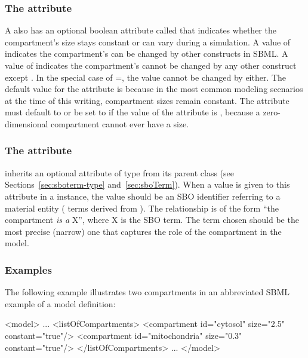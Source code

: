 \subsubsection{The  attribute}
\label{sec:compartment-constant}

A \Compartment also has an optional boolean attribute called
 that indicates whether the compartment's size
stays constant or can vary during a simulation.  A value of
 indicates the compartment's  can be
changed by other constructs in SBML.  A value of 
indicates the compartment's  cannot be changed by any
other construct except \InitialAssignment.  In the special case of
=, the value cannot be changed by
\InitialAssignment either.  The default value for the
 attribute is  because in the most common
modeling scenarios at the time of this writing, compartment sizes
remain constant.  The  attribute must default to or be
set to  if the value of the 
attribute is , because a zero-dimensional compartment cannot
ever have a size.


\subsubsection{The  attribute}
\label{sec:compartment-sboterm}

\Compartment inherits an optional 
attribute of type  from its parent
class \SBase (see Sections~\ref{sec:sboterm-type}
and~\ref{sec:sboTerm}).  When a value is given to this
attribute in a \Compartment instance, the value should be
an SBO identifier referring to a material entity (\ie
terms derived from \sbomaterialentity).  The relationship is
of the form ``the compartment \emph{is a} X'', where X is the SBO
term.  The term chosen should be the most precise (narrow) one
that captures the role of the compartment in the model.


\subsubsection{Examples}

The following example illustrates two compartments in an
abbreviated SBML example of a model definition:

\begin{example}
<model>
    ...
    <listOfCompartments>
        <compartment id="cytosol" size="2.5" constant="true"/>
        <compartment id="mitochondria" size="0.3" constant="true"/>
    </listOfCompartments>
    ...
</model>

\end{example}


